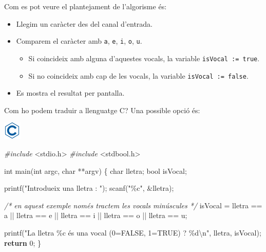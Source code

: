 \documentclass[
]{book}
\newenvironment{Shaded}{\begin{snugshade}}{\end{snugshade}}
\newcommand{\CharTok}[1]{\textcolor[rgb]{0.31,0.60,0.02}{#1}}
\newcommand{\CommentTok}[1]{\textcolor[rgb]{0.56,0.35,0.01}{\textit{#1}}}
\newcommand{\ControlFlowTok}[1]{\textcolor[rgb]{0.13,0.29,0.53}{\textbf{#1}}}
\newcommand{\DataTypeTok}[1]{\textcolor[rgb]{0.13,0.29,0.53}{#1}}
\newcommand{\DecValTok}[1]{\textcolor[rgb]{0.00,0.00,0.81}{#1}}
\newcommand{\ImportTok}[1]{#1}
\newcommand{\NormalTok}[1]{#1}
\newcommand{\PreprocessorTok}[1]{\textcolor[rgb]{0.56,0.35,0.01}{\textit{#1}}}
\newcommand{\SpecialCharTok}[1]{\textcolor[rgb]{0.00,0.00,0.00}{#1}}
\newcommand{\StringTok}[1]{\textcolor[rgb]{0.31,0.60,0.02}{#1}}
\providecommand{\tightlist}{%
  \setlength{\itemsep}{0pt}\setlength{\parskip}{0pt}}
\begin{document}
Com es pot veure el plantejament de l'algorisme és:

\begin{itemize}
\tightlist
\item
  Llegim un caràcter des del canal d'entrada.
\item
  Comparem el caràcter amb \texttt{a}, \texttt{e}, \texttt{i}, \texttt{o}, \texttt{u}.

  \begin{itemize}
  \tightlist
  \item
    Si coincideix amb alguna d'aquestes vocals, la variable \texttt{isVocal\ :=\ true}.
  \item
    Si no coincideix amb cap de les vocals, la variable \texttt{isVocal\ :=\ false}.
  \end{itemize}
\item
  Es mostra el resultat per pantalla.
\end{itemize}

Com ho podem traduir a llenguatge C? Una possible opció és:

\includegraphics{./img/c.png}

\begin{Shaded}
\begin{Highlighting}[]
\PreprocessorTok{\#include }\ImportTok{\textless{}stdio.h\textgreater{}}
\PreprocessorTok{\#include }\ImportTok{\textless{}stdbool.h\textgreater{}}

\DataTypeTok{int}\NormalTok{ main(}\DataTypeTok{int}\NormalTok{ argc, }\DataTypeTok{char}\NormalTok{ **argv) \{}
    \DataTypeTok{char}\NormalTok{ lletra;}
    \DataTypeTok{bool}\NormalTok{ isVocal;}

\NormalTok{    printf(}\StringTok{"Introdueix una lletra : "}\NormalTok{);}
\NormalTok{    scanf(}\StringTok{"\%c"}\NormalTok{, \&lletra);}

    \CommentTok{/* en aquest exemple només tractem les vocals minúscules */}
\NormalTok{    isVocal = lletra == }\CharTok{\textquotesingle{}a\textquotesingle{}}\NormalTok{ || lletra == }\CharTok{\textquotesingle{}e\textquotesingle{}}\NormalTok{ || lletra == }\CharTok{\textquotesingle{}i\textquotesingle{}}\NormalTok{ || lletra == }\CharTok{\textquotesingle{}o\textquotesingle{}}\NormalTok{ || lletra == }\CharTok{\textquotesingle{}u\textquotesingle{}}\NormalTok{;}

\NormalTok{    printf(}\StringTok{"La lletra \%c és una vocal (0=FALSE, 1=TRUE) ? \%d}\SpecialCharTok{\textbackslash{}n}\StringTok{"}\NormalTok{, lletra, isVocal);}
    \ControlFlowTok{return} \DecValTok{0}\NormalTok{;}
\NormalTok{\}}
\end{Highlighting}
\end{Shaded}
\end{document}
